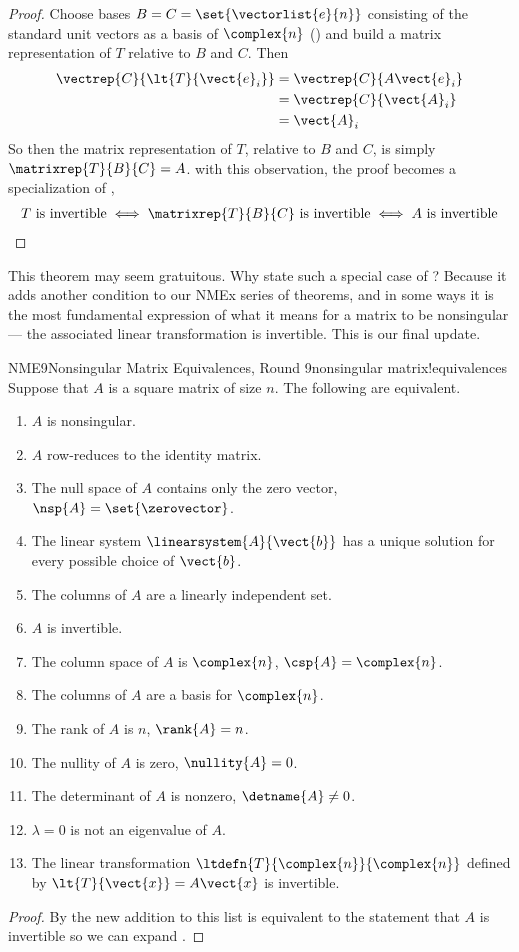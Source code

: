 \begin{proof}
Choose bases $B=C=\set{\vectorlist{e}{n}}$ consisting of the standard unit vectors as a basis of $\complex{n}$ () and build a matrix representation of $T$ relative to $B$ and $C$.  Then
%
\begin{align*}
\vectrep{C}{\lt{T}{\vect{e}_i}}
&=\vectrep{C}{A\vect{e}_i}\\
%
&=\vectrep{C}{\vect{A}_i}\\
%
&=\vect{A}_i
\end{align*}
%
So then the matrix representation of $T$, relative to $B$ and $C$, is simply $\matrixrep{T}{B}{C}=A$.  with this observation, the proof becomes a specialization of ,
%
\begin{align*}
%
T\text{ is invertible}
\iff\matrixrep{T}{B}{C}\text{ is invertible}
\iff A\text{ is invertible}
\end{align*}
%
\end{proof}
%
This theorem may seem gratuitous.  Why state such a special case of ?  Because it adds another condition to our NMEx series of theorems, and in some ways it is the most fundamental expression of what it means for a matrix to be nonsingular --- the associated linear transformation is invertible.  This is our final update.
%
\begin{theorem}{NME9}{Nonsingular Matrix Equivalences, Round 9}{nonsingular matrix!equivalences}
Suppose that $A$ is a square matrix of size $n$.  The following are equivalent.
%
\begin{enumerate}
\item $A$ is nonsingular.
\item $A$ row-reduces to the identity matrix.
\item The null space of $A$ contains only the zero vector, $\nsp{A}=\set{\zerovector}$.
\item The linear system $\linearsystem{A}{\vect{b}}$ has a unique solution for every possible choice of $\vect{b}$.
\item The columns of $A$ are a linearly independent set.
\item $A$ is invertible.
\item The column space of $A$ is $\complex{n}$, $\csp{A}=\complex{n}$.
\item The columns of $A$ are a basis for $\complex{n}$.
\item The rank of $A$ is $n$, $\rank{A}=n$.
\item The nullity of $A$ is zero, $\nullity{A}=0$.
\item The determinant of $A$ is nonzero, $\detname{A}\neq 0$.
\item $\lambda=0$ is not an eigenvalue of $A$.
\item The linear transformation $\ltdefn{T}{\complex{n}}{\complex{n}}$ defined by $\lt{T}{\vect{x}}=A\vect{x}$ is invertible.
\end{enumerate}
\end{theorem}
%
\begin{proof}
By  the new addition to this list is equivalent to the statement that $A$ is invertible so we can expand .
\end{proof}
%
